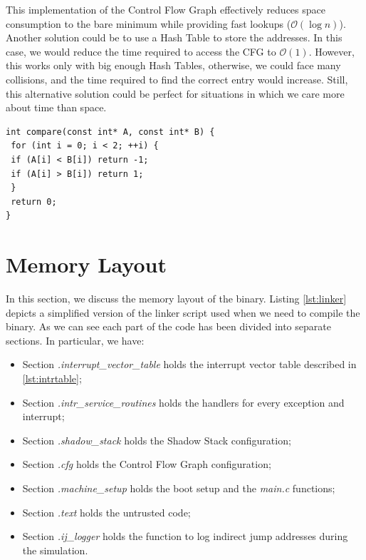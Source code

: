 This implementation of the Control Flow Graph effectively reduces space consumption
to the bare minimum while providing fast lookups ($\mathcal{O}(\log{n})$).
Another solution could be to use a Hash Table to store the addresses. In this case,
we would reduce the time required to access the CFG to $\mathcal{O}(1)$. However,
this works only with big enough Hash Tables, otherwise, we could face many
collisions, and the time required to find the correct entry would increase.
Still, this alternative solution could be perfect for situations in which we care
more about time than space.

\begin{lstlisting}[style=CStyle, caption= Comparison for binary search, label={lst:binsearch}]
int compare(const int* A, const int* B) {
 for (int i = 0; i < 2; ++i) {
 if (A[i] < B[i]) return -1;
 if (A[i] > B[i]) return 1;
 }
 return 0;
}
\end{lstlisting}

\section{Memory Layout}
\label{sec:layout}

In this section, we discuss the memory layout of the binary. Listing \ref{lst:linker}
depicts a simplified version of the linker script used when we need to compile the
binary. As we can see each part of the code has been divided into separate
sections. In particular, we have:
\begin{itemize}[noitemsep]
  \item Section \textit{.interrupt\_vector\_table} holds the interrupt vector
    table described in \ref{lst:intrtable};

  \item Section \textit{.intr\_service\_routines} holds the handlers for every
    exception and interrupt;

  \item Section \textit{.shadow\_stack} holds the Shadow Stack configuration;

  \item Section \textit{.cfg} holds the Control Flow Graph configuration;

  \item Section \textit{.machine\_setup} holds the boot setup and the \textit{main.c}
    functions;

  \item Section \textit{.text} holds the untrusted code;

  \item Section \textit{.ij\_logger} holds the function to log indirect jump
    addresses during the simulation.
\end{itemize}

